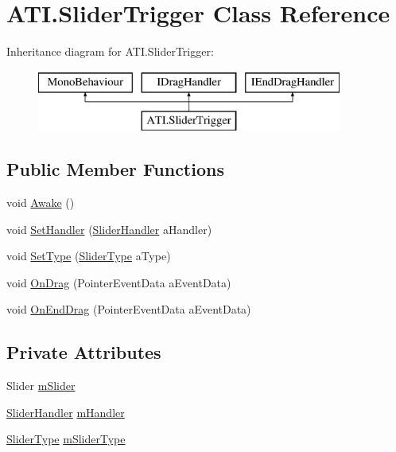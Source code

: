 \hypertarget{class_a_t_i_1_1_slider_trigger}{}\section{A\+T\+I.\+Slider\+Trigger Class Reference}
\label{class_a_t_i_1_1_slider_trigger}
Inheritance diagram for A\+T\+I.\+Slider\+Trigger\+:\begin{figure}[H]
\begin{center}
\leavevmode
\includegraphics[height=2.000000cm]{class_a_t_i_1_1_slider_trigger}
\end{center}
\end{figure}
\subsection*{Public Member Functions}
\begin{DoxyCompactItemize}
\item 
void \hyperlink{class_a_t_i_1_1_slider_trigger_a03b00593630437fbf23973564ebd35ec}{Awake} ()
\item 
void \hyperlink{class_a_t_i_1_1_slider_trigger_a258f79d013266d0c82a5382525adcdef}{Set\+Handler} (\hyperlink{class_a_t_i_1_1_slider_handler}{Slider\+Handler} a\+Handler)
\item 
void \hyperlink{class_a_t_i_1_1_slider_trigger_a90347192aede3444d468ed2ab0d97f6c}{Set\+Type} (\hyperlink{class_a_t_i_ac4c6056a99cbd16ff0d292d33b038b9b}{Slider\+Type} a\+Type)
\item 
void \hyperlink{class_a_t_i_1_1_slider_trigger_abed7a842d506b1f727b7e2b3cbb58aae}{On\+Drag} (Pointer\+Event\+Data a\+Event\+Data)
\item 
void \hyperlink{class_a_t_i_1_1_slider_trigger_ae58a83edce79a49d1fd21317c7536b48}{On\+End\+Drag} (Pointer\+Event\+Data a\+Event\+Data)
\end{DoxyCompactItemize}
\subsection*{Private Attributes}
\begin{DoxyCompactItemize}
\item 
Slider \hyperlink{class_a_t_i_1_1_slider_trigger_adb4a609592234cac1451eeeb2d394740}{m\+Slider}
\item 
\hyperlink{class_a_t_i_1_1_slider_handler}{Slider\+Handler} \hyperlink{class_a_t_i_1_1_slider_trigger_ab2c5ecc1828e1618dc7966aa815fdaba}{m\+Handler}
\item 
\hyperlink{class_a_t_i_ac4c6056a99cbd16ff0d292d33b038b9b}{Slider\+Type} \hyperlink{class_a_t_i_1_1_slider_trigger_a62a01bc9c41be54f58bd77664181fd5d}{m\+Slider\+Type}
\end{DoxyCompactItemize}



